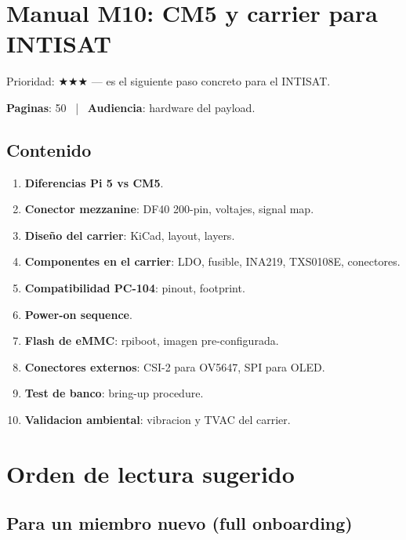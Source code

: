 \documentclass[11pt,a4paper,oneside]{report}
\begin{document}
\chapter{Manual M10: CM5 y carrier para INTISAT}

\begin{prioritario}
Prioridad: $\bigstar\bigstar\bigstar$ --- es el siguiente paso concreto
para el INTISAT.
\end{prioritario}

\textbf{Paginas}: 50 ~|~ \textbf{Audiencia}: hardware del payload.

\section{Contenido}

\begin{enumerate}[leftmargin=2em]
  \item \textbf{Diferencias Pi 5 vs CM5}.
  \item \textbf{Conector mezzanine}: DF40 200-pin, voltajes, signal map.
  \item \textbf{Diseño del carrier}: KiCad, layout, layers.
  \item \textbf{Componentes en el carrier}: LDO, fusible, INA219,
        TXS0108E, conectores.
  \item \textbf{Compatibilidad PC-104}: pinout, footprint.
  \item \textbf{Power-on sequence}.
  \item \textbf{Flash de eMMC}: rpiboot, imagen pre-configurada.
  \item \textbf{Conectores externos}: CSI-2 para OV5647, SPI para OLED.
  \item \textbf{Test de banco}: bring-up procedure.
  \item \textbf{Validacion ambiental}: vibracion y TVAC del carrier.
\end{enumerate}

\chapter{Orden de lectura sugerido}

\section{Para un miembro nuevo (full onboarding)}
\end{document}
